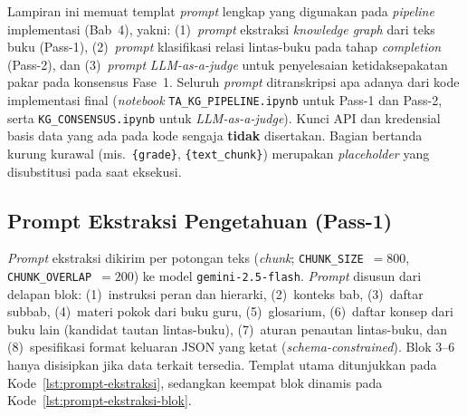 \documentclass[../../thesis]{subfiles}
\begin{document}
\ifSubfilesClassLoaded{}{\appendix\setcounter{chapter}{3}}

\label{lamp:prompt}

Lampiran ini memuat templat \textit{prompt} lengkap yang digunakan pada
\textit{pipeline} implementasi (Bab~4), yakni: (1)~\textit{prompt} ekstraksi
\textit{knowledge graph} dari teks buku (Pass-1), (2)~\textit{prompt}
klasifikasi relasi lintas-buku pada tahap \textit{completion} (Pass-2), dan
(3)~\textit{prompt} \textit{LLM-as-a-judge} untuk penyelesaian ketidaksepakatan
pakar pada konsensus Fase~1. Seluruh \textit{prompt} ditranskripsi apa adanya
dari kode implementasi final (\textit{notebook} \texttt{TA\_KG\_PIPELINE.ipynb}
untuk Pass-1 dan Pass-2, serta \texttt{KG\_CONSENSUS.ipynb} untuk
\textit{LLM-as-a-judge}). Kunci API dan kredensial basis data yang ada pada
kode sengaja \textbf{tidak} disertakan. Bagian bertanda kurung kurawal
(mis.\ \texttt{\{grade\}}, \texttt{\{text\_chunk\}}) merupakan \textit{placeholder}
yang disubstitusi pada saat eksekusi.

\subsection{Prompt Ekstraksi Pengetahuan (Pass-1)}
\label{lamp:prompt-ekstraksi}

\textit{Prompt} ekstraksi dikirim per potongan teks (\textit{chunk};
\texttt{CHUNK\_SIZE}~$=800$, \texttt{CHUNK\_OVERLAP}~$=200$) ke model
\texttt{gemini-2.5-flash}. \textit{Prompt} disusun dari delapan blok: (1)~instruksi
peran dan hierarki, (2)~konteks bab, (3)~daftar subbab, (4)~materi pokok dari
buku guru, (5)~glosarium, (6)~daftar konsep dari buku lain (kandidat tautan
lintas-buku), (7)~aturan penautan lintas-buku, dan (8)~spesifikasi format
keluaran JSON yang ketat (\textit{schema-constrained}). Blok 3--6 hanya
disisipkan jika data terkait tersedia. Templat utama ditunjukkan pada
Kode~\ref{lst:prompt-ekstraksi}, sedangkan keempat blok dinamis pada
Kode~\ref{lst:prompt-ekstraksi-blok}.
\end{document}
